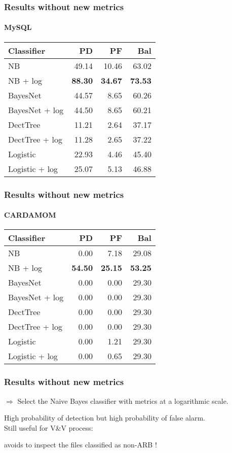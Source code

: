 \begin{frame}
 \frametitle{Results without new metrics}
 \framesubtitle{MySQL}
 \begin{center}
 \begin{tabular}{lrrr}
  \hspace{0.2cm} Classifier & PD & PF & Bal\\
  \hline
  NB & 49.14 & 10.46 & 63.02\\
  NB + log &  \textbf{88.30} & \textbf{34.67} & \textbf{73.53}\\
  BayesNet & 44.57 & 8.65 & 60.26\\
  BayesNet + log & 44.50 & 8.65 & 60.21\\
  DectTree & 11.21 & 2.64 & 37.17\\
  DectTree + log & 11.28 & 2.65 & 37.22\\
  Logistic & 22.93 & 4.46 & 45.40\\
  Logistic + log & 25.07 & 5.13 & 46.88\\
  \hline
 \end{tabular}
 \end{center}
\end{frame}

\begin{frame}
 \frametitle{Results without new metrics}
 \framesubtitle{CARDAMOM}
 \begin{center}
 \begin{tabular}{lrrr}
  \hspace{0.2cm} Classifier & PD & PF & Bal\\
  \hline
  NB & 0.00 & 7.18 & 29.08\\
  NB + log &  \textbf{54.50} & \textbf{25.15} & \textbf{53.25}\\
  BayesNet & 0.00 & 0.00 & 29.30\\
  BayesNet + log & 0.00 & 0.00 & 29.30\\
  DectTree & 0.00 & 0.00 & 29.30\\
  DectTree + log & 0.00 & 0.00 & 29.30\\
  Logistic & 0.00 & 1.21 & 29.30\\
  Logistic + log & 0.00 & 0.65 & 29.30\\
  \hline
 \end{tabular}
 \end{center}
\end{frame}

\begin{frame}
 \frametitle{Results without new metrics}
 \begin{center}
  $\Longrightarrow$ \alert{Select the Naive Bayes classifier with metrics at a logarithmic scale.}
 \end{center}
 \vspace{1cm}
 High probability of detection but high probability of false alarm.\\%
 Still useful for V\&V process:
 \begin{center}
  \alert{avoids to inspect the files classified as non-ARB !}
 \end{center}
\end{frame}